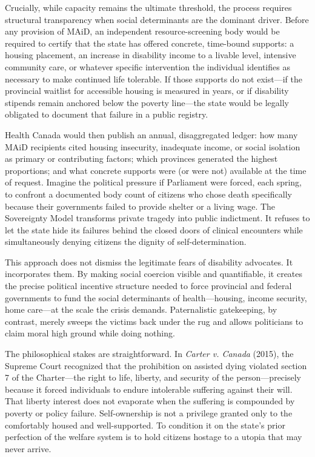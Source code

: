 \documentclass[11pt, letterpaper]{article}
\begin{document}
Crucially, while capacity remains the ultimate threshold, the process requires structural transparency when social determinants are the dominant driver. Before any provision of MAiD, an independent resource-screening body would be required to certify that the state has offered concrete, time-bound supports: a housing placement, an increase in disability income to a livable level, intensive community care, or whatever specific intervention the individual identifies as necessary to make continued life tolerable. If those supports do not exist---if the provincial waitlist for accessible housing is measured in years, or if disability stipends remain anchored below the poverty line---the state would be legally obligated to document that failure in a public registry.

Health Canada would then publish an annual, disaggregated ledger: how many MAiD recipients cited housing insecurity, inadequate income, or social isolation as primary or contributing factors; which provinces generated the highest proportions; and what concrete supports were (or were not) available at the time of request. Imagine the political pressure if Parliament were forced, each spring, to confront a documented body count of citizens who chose death specifically because their governments failed to provide shelter or a living wage. The Sovereignty Model transforms private tragedy into public indictment. It refuses to let the state hide its failures behind the closed doors of clinical encounters while simultaneously denying citizens the dignity of self-determination.

This approach does not dismiss the legitimate fears of disability advocates. It incorporates them. By making social coercion visible and quantifiable, it creates the precise political incentive structure needed to force provincial and federal governments to fund the social determinants of health---housing, income security, home care---at the scale the crisis demands. Paternalistic gatekeeping, by contrast, merely sweeps the victims back under the rug and allows politicians to claim moral high ground while doing nothing.

The philosophical stakes are straightforward. In \textit{Carter v. Canada} (2015), the Supreme Court recognized that the prohibition on assisted dying violated section 7 of the Charter---the right to life, liberty, and security of the person---precisely because it forced individuals to endure intolerable suffering against their will. That liberty interest does not evaporate when the suffering is compounded by poverty or policy failure. Self-ownership is not a privilege granted only to the comfortably housed and well-supported. To condition it on the state's prior perfection of the welfare system is to hold citizens hostage to a utopia that may never arrive.
\end{document}
